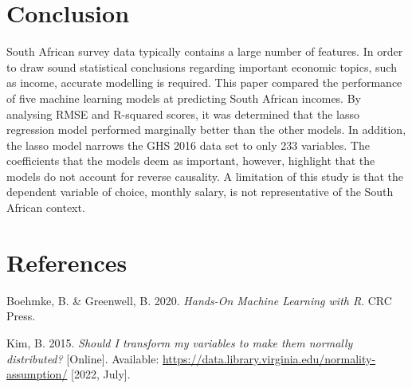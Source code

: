 \documentclass[11pt,preprint, authoryear]{elsarticle}
\numberwithin{equation}{section}
\numberwithin{figure}{section}
\numberwithin{table}{section}
\begin{document}
\hypertarget{conclusion}{%
\section{Conclusion}\label{conclusion}}

South African survey data typically contains a large number of features.
In order to draw sound statistical conclusions regarding important
economic topics, such as income, accurate modelling is required. This
paper compared the performance of five machine learning models at
predicting South African incomes. By analysing RMSE and R-squared
scores, it was determined that the lasso regression model performed
marginally better than the other models. In addition, the lasso model
narrows the GHS 2016 data set to only 233 variables. The coefficients
that the models deem as important, however, highlight that the models do
not account for reverse causality. A limitation of this study is that
the dependent variable of choice, monthly salary, is not representative
of the South African context.

\hfill

\newpage

\hypertarget{references}{%
\section*{References}\label{references}}

Boehmke, B. \& Greenwell, B. 2020. \emph{Hands-On Machine Learning with
R}. CRC Press.

Kim, B. 2015. \emph{Should I transform my variables to make them
normally distributed?} {[}Online{]}. Available:
\url{https://data.library.virginia.edu/normality-assumption/} {[}2022,
July{]}.


\end{document}
